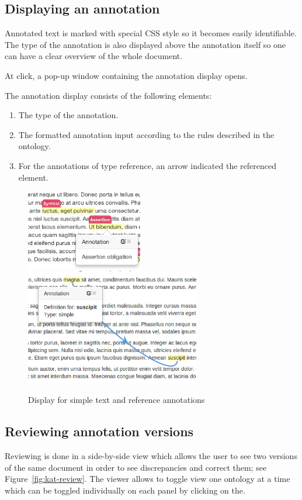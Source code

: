 \subsection{Displaying an annotation}

Annotated text is marked with special CSS style so it becomes easily identifiable.  The
type of the annotation is also displayed above the annotation itself so one can have a
clear overview of the whole document.

At click, a pop-up window containing the annotation display opens.

The annotation display consists of the following elements:
\begin{enumerate}
\item The type of the annotation.
\item The formatted annotation input according to the rules described in the ontology.
\item For the annotations of type reference, an arrow indicated the referenced element.
\end{enumerate}

\begin{figure}[ht]\centering
\includegraphics[width=2in]{figures/suscipit}
\includegraphics[width=3in]{figures/definition}
\caption{Display for simple text and reference annotations}\label{fig:suscipit-definition}
\end{figure}

\subsection{Reviewing annotation versions}
Reviewing is done in a side-by-side view which allows the user to see two versions of the
same document in order to see discrepancies and correct them; see
Figure~\ref{fig:kat-review}. The viewer allows to toggle view one ontology at a time which
can be toggled individually on each panel by clicking on the.

